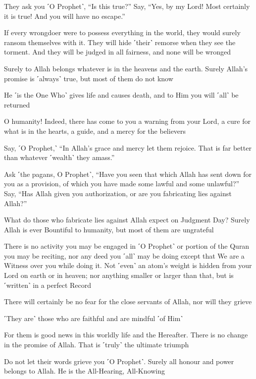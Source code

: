 They ask you ˹O Prophet˺, “Is this true?” Say, “Yes, by my Lord! Most certainly it is true! And you will have no escape.”

If every wrongdoer were to possess everything in the world, they would surely ransom themselves with it. They will hide ˹their˺ remorse when they see the torment. And they will be judged in all fairness, and none will be wronged

Surely to Allah belongs whatever is in the heavens and the earth. Surely Allah’s promise is ˹always˺ true, but most of them do not know

He ˹is the One Who˺ gives life and causes death, and to Him you will ˹all˺ be returned

O humanity! Indeed, there has come to you a warning from your Lord, a cure for what is in the hearts, a guide, and a mercy for the believers

Say, ˹O Prophet,˺ “In Allah’s grace and mercy let them rejoice. That is far better than whatever ˹wealth˺ they amass.”

Ask ˹the pagans, O Prophet˺, “Have you seen that which Allah has sent down for you as a provision, of which you have made some lawful and some unlawful?” Say, “Has Allah given you authorization, or are you fabricating lies against Allah?”

What do those who fabricate lies against Allah expect on Judgment Day? Surely Allah is ever Bountiful to humanity, but most of them are ungrateful

There is no activity you may be engaged in ˹O Prophet˺ or portion of the Quran you may be reciting, nor any deed you ˹all˺ may be doing except that We are a Witness over you while doing it. Not ˹even˺ an atom’s weight is hidden from your Lord on earth or in heaven; nor anything smaller or larger than that, but is ˹written˺ in a perfect Record

There will certainly be no fear for the close servants of Allah, nor will they grieve

˹They are˺ those who are faithful and are mindful ˹of Him˺

For them is good news in this worldly life and the Hereafter. There is no change in the promise of Allah. That is ˹truly˺ the ultimate triumph

Do not let their words grieve you ˹O Prophet˺. Surely all honour and power belongs to Allah. He is the All-Hearing, All-Knowing

